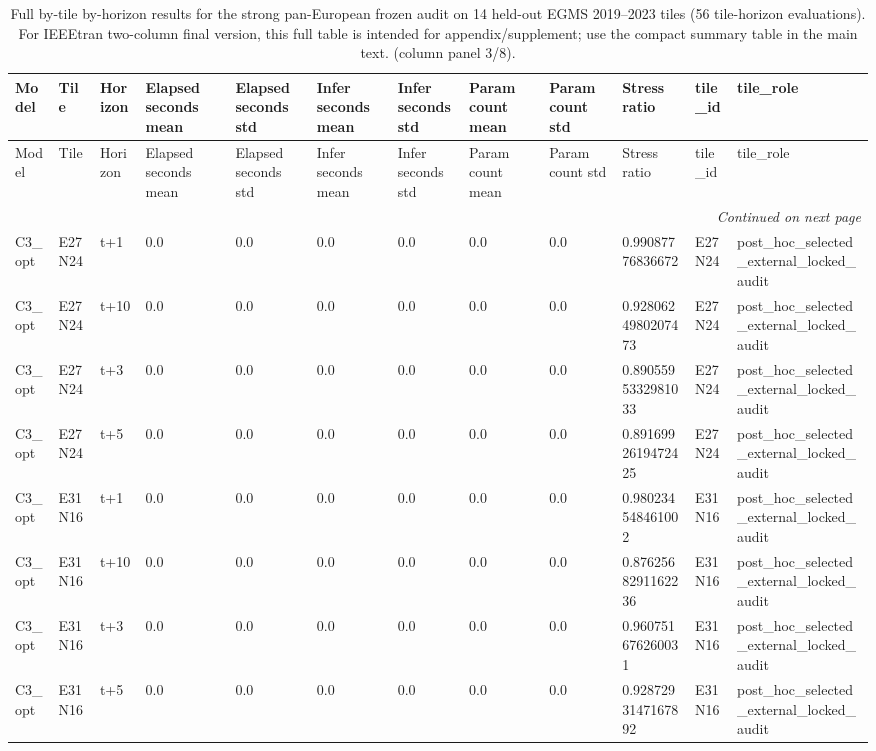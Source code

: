 \begin{landscape}
\scriptsize
\setlength{\LTleft}{0pt}
\setlength{\LTright}{0pt}
\begin{longtable}{llllllllllll}
\caption{Full by-tile by-horizon results for the strong pan-European frozen audit on 14 held-out EGMS 2019--2023 tiles (56 tile-horizon evaluations). For IEEEtran two-column final version, this full table is intended for appendix/supplement; use the compact summary table in the main text. (column panel 3/8).}\label{tab:e7_strong_by_tile_full_part3}\\
\toprule
Model & Tile & Horizon & Elapsed seconds mean & Elapsed seconds std & Infer seconds mean & Infer seconds std & Param count mean & Param count std & Stress ratio & tile\_id & tile\_role \\
\midrule
\endfirsthead
\toprule
Model & Tile & Horizon & Elapsed seconds mean & Elapsed seconds std & Infer seconds mean & Infer seconds std & Param count mean & Param count std & Stress ratio & tile\_id & tile\_role \\
\midrule
\endhead
\midrule
\multicolumn{12}{r}{\textit{Continued on next page}} \\
\endfoot
\bottomrule
\endlastfoot
C3\_opt & E27N24 & t+1 & 0.0 & 0.0 & 0.0 & 0.0 & 0.0 & 0.0 & 0.99087776836672 & E27N24 & post\_hoc\_selected\_external\_locked\_audit \\
C3\_opt & E27N24 & t+10 & 0.0 & 0.0 & 0.0 & 0.0 & 0.0 & 0.0 & 0.9280624980207473 & E27N24 & post\_hoc\_selected\_external\_locked\_audit \\
C3\_opt & E27N24 & t+3 & 0.0 & 0.0 & 0.0 & 0.0 & 0.0 & 0.0 & 0.8905595332981033 & E27N24 & post\_hoc\_selected\_external\_locked\_audit \\
C3\_opt & E27N24 & t+5 & 0.0 & 0.0 & 0.0 & 0.0 & 0.0 & 0.0 & 0.8916992619472425 & E27N24 & post\_hoc\_selected\_external\_locked\_audit \\
C3\_opt & E31N16 & t+1 & 0.0 & 0.0 & 0.0 & 0.0 & 0.0 & 0.0 & 0.980234548461002 & E31N16 & post\_hoc\_selected\_external\_locked\_audit \\
C3\_opt & E31N16 & t+10 & 0.0 & 0.0 & 0.0 & 0.0 & 0.0 & 0.0 & 0.8762568291162236 & E31N16 & post\_hoc\_selected\_external\_locked\_audit \\
C3\_opt & E31N16 & t+3 & 0.0 & 0.0 & 0.0 & 0.0 & 0.0 & 0.0 & 0.960751676260031 & E31N16 & post\_hoc\_selected\_external\_locked\_audit \\
C3\_opt & E31N16 & t+5 & 0.0 & 0.0 & 0.0 & 0.0 & 0.0 & 0.0 & 0.9287293147167892 & E31N16 & post\_hoc\_selected\_external\_locked\_audit \\

\end{longtable}
\end{landscape}
